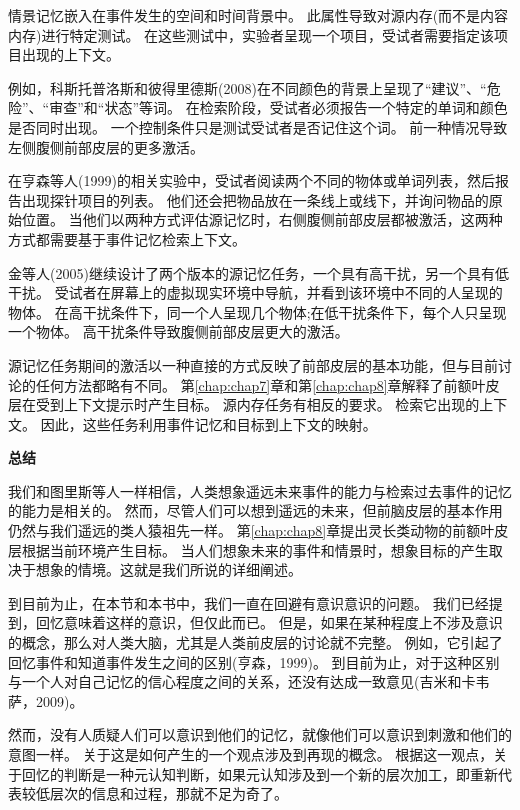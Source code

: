 情景记忆嵌入在事件发生的空间和时间背景中。
此属性导致对源内存(而不是内容内存)进行特定测试。
在这些测试中，实验者呈现一个项目，受试者需要指定该项目出现的上下文。


例如，科斯托普洛斯和彼得里德斯(2008)在不同颜色的背景上呈现了“建议”、“危险”、“审查”和“状态”等词。
在检索阶段，受试者必须报告一个特定的单词和颜色是否同时出现。
一个控制条件只是测试受试者是否记住这个词。
前一种情况导致左侧腹侧前部皮层的更多激活。


在亨森等人(1999)的相关实验中，受试者阅读两个不同的物体或单词列表，然后报告出现探针项目的列表。
他们还会把物品放在一条线上或线下，并询问物品的原始位置。
当他们以两种方式评估源记忆时，右侧腹侧前部皮层都被激活，这两种方式都需要基于事件记忆检索上下文。


金等人(2005)继续设计了两个版本的源记忆任务，一个具有高干扰，另一个具有低干扰。
受试者在屏幕上的虚拟现实环境中导航，并看到该环境中不同的人呈现的物体。
在高干扰条件下，同一个人呈现几个物体;在低干扰条件下，每个人只呈现一个物体。
高干扰条件导致腹侧前部皮层更大的激活。


源记忆任务期间的激活以一种直接的方式反映了前部皮层的基本功能，但与目前讨论的任何方法都略有不同。
第\ref{chap:chap7}章和第\ref{chap:chap8}章解释了前额叶皮层在受到上下文提示时产生目标。
源内存任务有相反的要求。
检索它出现的上下文。
因此，这些任务利用事件记忆和目标到上下文的映射。



\textbf{总结}

我们和图里斯等人一样相信，人类想象遥远未来事件的能力与检索过去事件的记忆的能力是相关的。
然而，尽管人们可以想到遥远的未来，但前脑皮层的基本作用仍然与我们遥远的类人猿祖先一样。
第\ref{chap:chap8}章提出灵长类动物的前额叶皮层根据当前环境产生目标。
当人们想象未来的事件和情景时，想象目标的产生取决于想象的情境。这就是我们所说的详细阐述。


到目前为止，在本节和本书中，我们一直在回避有意识意识的问题。
我们已经提到，回忆意味着这样的意识，但仅此而已。
但是，如果在某种程度上不涉及意识的概念，那么对人类大脑，尤其是人类前皮层的讨论就不完整。
例如，它引起了回忆事件和知道事件发生之间的区别(亨森，1999)。
到目前为止，对于这种区别与一个人对自己记忆的信心程度之间的关系，还没有达成一致意见(吉米和卡韦萨，2009)。


然而，没有人质疑人们可以意识到他们的记忆，就像他们可以意识到刺激和他们的意图一样。
关于这是如何产生的一个观点涉及到再现的概念。
根据这一观点，关于回忆的判断是一种元认知判断，如果元认知涉及到一个新的层次加工，即重新代表较低层次的信息和过程，那就不足为奇了。



